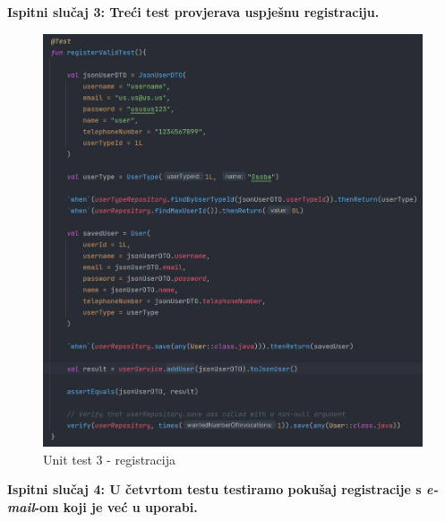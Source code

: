 \pagebreak		
\textbf{Ispitni slučaj 3: Treći test provjerava uspješnu registraciju.}

		\begin{figure}[H]
			\includegraphics[scale=0.5]{slike/unit3.PNG} 
			\centering
			\caption{Unit test 3 - registracija}
			\label{unit3}
		\end{figure}
		
\pagebreak		
\textbf{Ispitni slučaj 4: U četvrtom testu testiramo pokušaj registracije s \textit{e-mail}-om koji je već u uporabi.}

